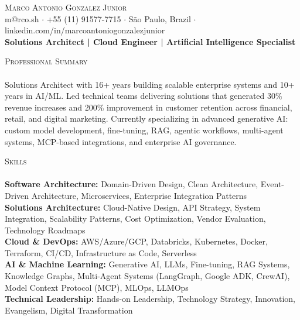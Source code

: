 \documentclass[a4paper]{article}
\newcommand{\lineunder} {
    \vspace*{-8pt} \\
    \hspace*{-18pt} \hrulefill \\
}
\newcommand{\header} [1] {
    {\hspace*{-18pt}\vspace*{6pt} \textsc{#1}}
    \vspace*{-6pt} \lineunder
}
\begin{document}
\vspace*{-20pt}

\begin{center}
    {\Huge \scshape {Marco Antonio Gonzalez Junior}}\\
    \vspace{2pt}
    m@rco.sh $\cdot$ +55 (11) 91577-7715 $\cdot$ São Paulo, Brazil $\cdot$ linkedin.com/in/marcoantoniogonzalezjunior\\
    \vspace{1mm}
    \textbf{Solutions Architect | Cloud Engineer | Artificial Intelligence Specialist}
\end{center}
\vspace{-2mm}

\header{Professional Summary}
\vspace{1mm}
Solutions Architect with 16+ years building scalable enterprise systems and 10+ years in AI/ML. Led technical teams delivering solutions that generated 30\% revenue increases and 200\% improvement in customer retention across financial, retail, and digital marketing. Currently specializing in advanced generative AI: custom model development, fine-tuning, RAG, agentic workflows, multi-agent systems, MCP-based integrations, and enterprise AI governance.\\
\vspace{1mm}

\header{Skills}
\vspace{1mm}
\textbf{Software Architecture:} Domain-Driven Design, Clean Architecture, Event-Driven Architecture, Microservices, Enterprise Integration Patterns\\[2pt]
\textbf{Solutions Architecture:} Cloud-Native Design, API Strategy, System Integration, Scalability Patterns, Cost Optimization, Vendor Evaluation, Technology Roadmaps\\[2pt]
\textbf{Cloud \& DevOps:} AWS/Azure/GCP, Databricks, Kubernetes, Docker, Terraform, CI/CD, Infrastructure as Code, Serverless\\[2pt]
\textbf{AI \& Machine Learning:} Generative AI, LLMs, Fine-tuning, RAG Systems, Knowledge Graphs, Multi-Agent Systems (LangGraph, Google ADK, CrewAI), Model Context Protocol (MCP), MLOps, LLMOps\\[2pt]
\textbf{Technical Leadership:} Hands-on Leadership, Technology Strategy, Innovation, Evangelism, Digital Transformation\\[2pt]
\vspace{1mm}
\end{document}
